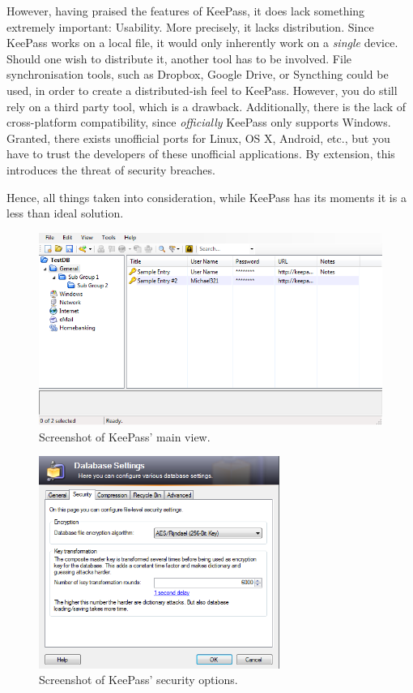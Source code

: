 			However, having praised the features of KeePass, it does lack something extremely important: Usability. More precisely, it lacks distribution. Since KeePass works on a local file, it would only inherently work on a \emph{single} device. Should one wish to distribute it, another tool has to be involved. File synchronisation tools, such as Dropbox, Google Drive, or Syncthing could be used, in order to create a distributed-ish feel to KeePass. However, you do still rely on a third party tool, which is a drawback. Additionally, there is the lack of cross-platform compatibility, since \emph{officially} KeePass only supports Windows. Granted, there exists unofficial ports for Linux, OS X, Android, etc., but you have to trust the developers of these unofficial applications. By extension, this introduces the threat of security breaches. 

			Hence, all things taken into consideration, while KeePass has its moments it is a less than ideal solution.

			
			\begin{figure}[h!]
				\centering
				\includegraphics[width=\textwidth]{figures/analysis/keepass_mainview.png}
				\caption{Screenshot of KeePass' main view.}
				\label{fig:keepass_main}
			\end{figure}

			\begin{figure}[h!]
				\centering
				\includegraphics[width=0.7\textwidth]{figures/analysis/keepass_create_security.png}
				\caption{Screenshot of KeePass' security options.}
				\label{fig:keepass_create_security}
			\end{figure}
		
